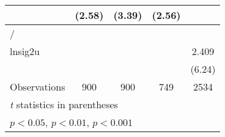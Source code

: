 {\begin{longtable}{l*{4}{c}}
                &   (2.58)         &   (3.39)         &   (2.56)         &                  \\
\hline
/               &                  &                  &                  &                  \\
lnsig2u         &                  &                  &                  &    2.409\sym{***}\\
                &                  &                  &                  &   (6.24)         \\
\hline
Observations    &      900         &      900         &      749         &     2534         \\
\hline\hline
\multicolumn{5}{l}{\footnotesize \textit{t} statistics in parentheses}\\
\multicolumn{5}{l}{\footnotesize \sym{*} \(p<0.05\), \sym{**} \(p<0.01\), \sym{***} \(p<0.001\)}\\
\end{longtable}
}
